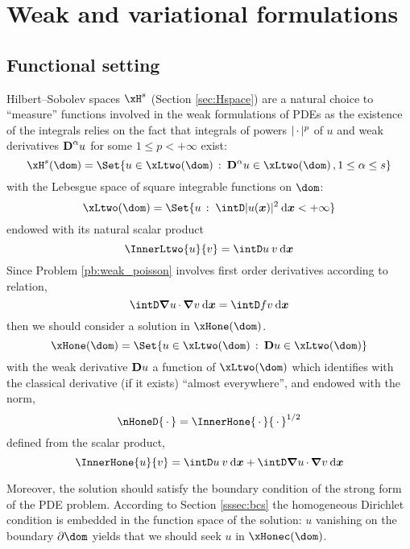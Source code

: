 \section{Weak and variational formulations}\label{sec:weak_forms}

\subsection{Functional setting}

Hilbert--Sobolev spaces $\xH^s$ (Section \ref{sec:Hspace}) are a natural choice to ``measure'' functions involved in the weak formulations of PDEs as the existence of the integrals relies on the fact that integrals of powers $|\,{\mathbf\cdot}\,|^p$ of $u$ and weak derivatives ${\boldsymbol{\mathrm D}}^\alpha u$ for some $1 \leq p < +\infty$ exist:
\begin{equation*}
\xH^s(\dom) = \Set{ u \in \xLtwo(\dom)\,:\: \D^\alpha u \in \xLtwo(\dom)\,, 1 \leq \alpha \leq s }
\end{equation*}
with the Lebesgue space of square integrable functions on $\dom$:
\begin{equation*}
\xLtwo(\dom) = \Set{ u\,:\; \intD |u(\xx)|^2 \dxx < +\infty  }
\end{equation*}
endowed with its natural scalar product
\begin{equation*}
\InnerLtwo{u}{v} = \intD u\: v\dxx
\end{equation*}
Since Problem \eqref{pb:weak_poisson} involves first order derivatives according to relation,
\begin{equation*}
\intD \Grad u\xDot \Grad v\dxx = \intD f v  \dxx
\end{equation*}
then we should consider a solution in $\xHone(\dom)$.
\begin{equation*}
\xHone(\dom) = \Set{ u \in \xLtwo(\dom)\,:\: \D u \in \xLtwo(\dom) }
\end{equation*}
with the weak derivative ${\boldsymbol{\mathrm D}} u$ \ie a function of $\xLtwo(\dom)$ which identifies with the classical derivative (if it exists) ``almost everywhere'', and endowed with the norm,
\begin{equation*}
\nHoneD{\xDot} = \InnerHone{\xDot}{\xDot}^{1/2}
\end{equation*}
defined from the scalar product,
\begin{equation*}
\InnerHone{u}{v} = \intD u\: v\dxx + \intD \Grad u\xDot \Grad v\dxx
\end{equation*}

\medskip
Moreover, the solution should satisfy the boundary condition of the strong form of the PDE problem. According to Section \ref{sssec:bcs} the homogeneous Dirichlet condition is embedded in the function space of the solution: $u$ vanishing on the boundary $\partial \dom$ yields that we should seek $u$ in $\xHonec(\dom)$.


